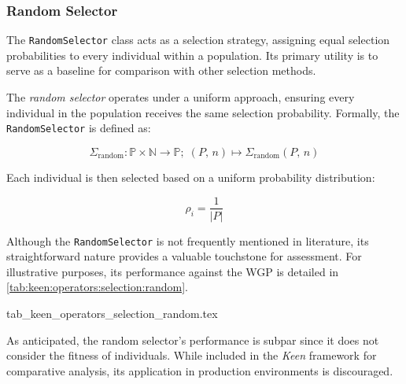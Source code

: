 \subsubsection{Random Selector}
\label{sec:keen:operators:selection:random}
  The \texttt{RandomSelector} class acts as a selection strategy, assigning 
  equal selection probabilities to every individual within a population.
  Its primary utility is to serve as a baseline for comparison with other 
  selection methods.

  \begin{definition}
  \label{def:keen:operators:selection:random}
    The \emph{random selector} operates under a uniform approach, ensuring every 
    individual in the population receives the same selection probability. 
    Formally, the \texttt{RandomSelector} is defined as:

    \begin{equation}
      \Sigma_{\mathrm{random}} : 
        \mathbb{P} \times \mathbb{N} \to \mathbb{P};\; 
      (P,\, n) \mapsto \Sigma_{\mathrm{random}}(P,\, n)  
    \end{equation}

    Each individual is then selected based on a uniform probability 
    distribution:

    \begin{equation}
      \rho_i = \frac{1}{|P|}
    \end{equation}
  \end{definition}

  Although the \texttt{RandomSelector} is not frequently mentioned in 
  literature, its straightforward nature provides a valuable touchstone for 
  assessment.
  For illustrative purposes, its performance against the WGP is detailed in 
  \vref{tab:keen:operators:selection:random}.

  {tab_keen_operators_selection_random.tex}

  As anticipated, the random selector's performance is subpar since it does not 
  consider the fitness of individuals.
  While included in the \textit{Keen} framework for comparative analysis, its 
  application in production environments is discouraged.

